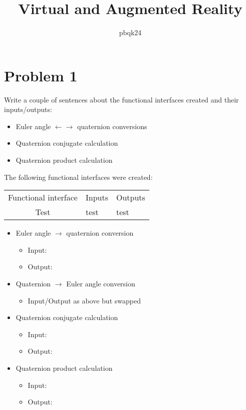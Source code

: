 \documentclass[12pt,a4paper]{article}
\title{\vspace{-6em}Virtual and Augmented Reality}
\author{pbqk24}
\begin{document}
	
	\maketitle
	
	\section*{Problem 1}
	
	Write a couple of sentences about the functional interfaces created and their inputs/outputs:
	\begin{itemize}
		\item Euler angle $\leftarrow\rightarrow$ quaternion conversions
		\item Quaternion conjugate calculation
		\item Quaternion product calculation
	\end{itemize}
	
	The following functional interfaces were created:
	
	\begin{tabular}{|c|ll|}
		\hline
		Functional interface&Inputs&Outputs\\
		Test&test&test\\
		\hline
	\end{tabular}
	
	
	\begin{itemize}
		\setlength{\itemsep}{0em}
		\item Euler angle $\rightarrow$ quaternion conversion
		\begin{itemize}
			\setlength{\itemsep}{0em}
			\item Input:
			\item Output:
		\end{itemize}
		\item Quaternion $\rightarrow$ Euler angle conversion
		\begin{itemize}
			\item Input/Output as above but swapped
		\end{itemize}
		\item Quaternion conjugate calculation
		\begin{itemize}
			\item Input: 
			\item Output:
		\end{itemize}
		\item Quaternion product calculation
		\begin{itemize}
			\item Input:
			\item Output: 
		\end{itemize}
	\end{itemize}
	
\end{document}
